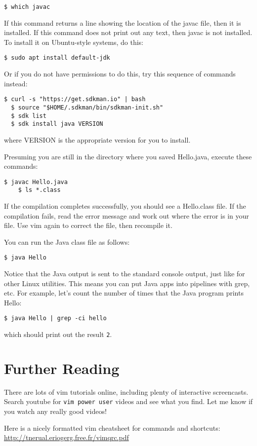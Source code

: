 \documentclass{article}
\begin{document}
\begin{lstlisting}[style=BashInputStyle]
    $ which javac
\end{lstlisting}

If this command returns a line showing the location of the javac file, then it is installed. If this command does not print out any text, then javac is not installed. To install it on Ubuntu-style systems, do this:

\begin{lstlisting}[style=BashInputStyle]
    $ sudo apt install default-jdk
\end{lstlisting}

Or if you do not have permissions to do this, try this sequence of commands instead:
\begin{lstlisting}[style=BashInputStyle]
  $ curl -s "https://get.sdkman.io" | bash
  $ source "$HOME/.sdkman/bin/sdkman-init.sh"
  $ sdk list
  $ sdk install java VERSION
\end{lstlisting}

where VERSION is the appropriate version for you to install.


Presuming you are still in the directory where you saved Hello.java, execute these commands:

\begin{lstlisting}[style=BashInputStyle]
    $ javac Hello.java
    $ ls *.class
\end{lstlisting}

If the compilation completes successfully, you should see a Hello.class file. If the compilation fails, read the error message and work out where the error is in your file. Use vim again to correct the file, then recompile it.

You can run the Java class file as follows:
\begin{lstlisting}[style=BashInputStyle]
    $ java Hello
\end{lstlisting}

Notice that the Java output is sent to the standard console output, just like for other Linux utilities. This means you can put Java apps into pipelines with grep, etc. For example, let's count the number of times that the Java program prints Hello:
\begin{lstlisting}[style=BashInputStyle]
    $ java Hello | grep -ci hello
\end{lstlisting}

which should print out the result \texttt{2}.

\section*{Further Reading}

There are lots of vim tutorials online, including plenty of interactive screencasts. Search youtube for \texttt{vim power user} videos and see what you find. Let me know if you watch any really good videos!

Here is a nicely formatted vim cheatsheet for commands and shortcuts:
\url{http://tnerual.eriogerg.free.fr/vimqrc.pdf}
\end{document}
